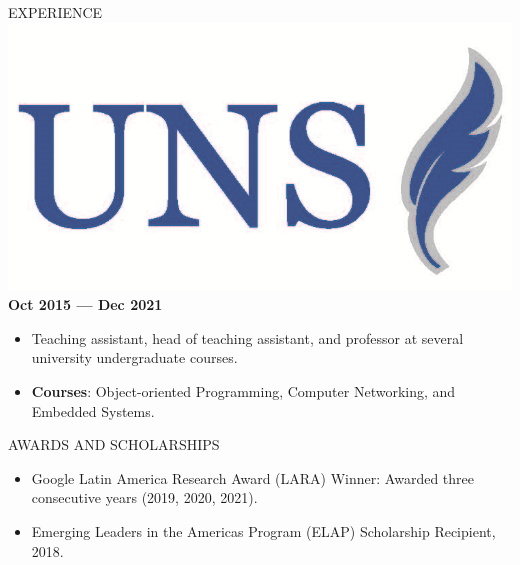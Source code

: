 \documentclass{resume}
\begin{document}
\begin{rSection}{EXPERIENCE}
\includegraphics[height=3\fontcharht\font`\B]{uns_logo.png}%
 \hfill \textbf{Oct 2015 --- Dec 2021}\vspace{-0.2cm}
\begin{itemize}
    \item Teaching assistant, head of teaching assistant, and professor at several university undergraduate courses.
    \vspace{-0.25cm}
    \item \textbf{Courses}: Object-oriented Programming, Computer Networking, and Embedded Systems. 
\end{itemize}
\end{rSection} 

\vspace{-0.2cm}
\begin{rSection}{AWARDS AND SCHOLARSHIPS} 
\begin{itemize}
    \item Google Latin America Research Award (LARA) Winner: Awarded three consecutive years (2019, 2020, 2021).
    \vspace{-0.25cm}
    \item Emerging Leaders in the Americas Program (ELAP) Scholarship Recipient, 2018.  
\end{itemize}
\end{rSection}
\end{document}
